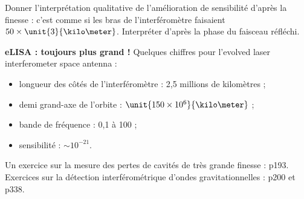 Donner l'interprétation qualitative de l'amélioration de sensibilité d'après la finesse : c'est comme si les bras de l'interféromètre faisaient $50\times \unit{3}{\kilo\meter}$.
Interpréter d'après la phase du faisceau réfléchi.

\begin{slide}
\textbf{eLISA : toujours plus grand !}
Quelques chiffres pour l'evolved laser interferometer space antenna :
\begin{itemize}
\item longueur des côtés de l'interféromètre : 2{,}5 millions de kilomètres ;
\item demi grand-axe de l'orbite : $\unit{150\times10^6}{\kilo\meter}$ ;
\item bande de fréquence : 0{,}1 à \unit{100}{\milli\hertz} ;
\item sensibilité : $\sim 10^{-21}$.
\end{itemize}
\end{slide}

\begin{funfact}
Un exercice sur la mesure des pertes de cavités de très grande finesse : \cite{Graner2011} p193.
Exercices sur la détection interférométrique d'ondes gravitationnelles : \cite{Graner2011} p200 et \cite{Augier2014} p338.
\end{funfact}


\newpage